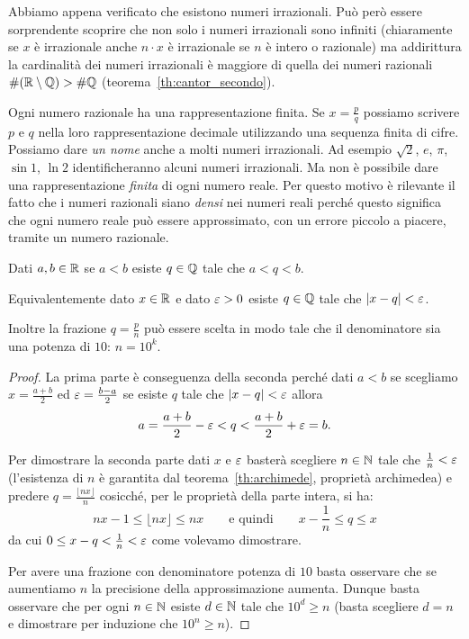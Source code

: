 Abbiamo appena verificato che esistono numeri irrazionali. 
Può però essere sorprendente scoprire che non solo i numeri irrazionali 
sono infiniti (chiaramente se $x$ è irrazionale anche $n\cdot x$ è irrazionale 
se $n$ è intero o razionale) ma addirittura la cardinalità 
dei numeri irrazionali è maggiore di quella dei numeri razionali 
$\# ({\mathbb R}\setminus {\mathbb Q}) > \# {\mathbb Q}$ (teorema~\ref{th:cantor_secondo}).

Ogni numero razionale ha una rappresentazione finita. 
Se $x=\frac p q$ possiamo scrivere $p$ e $q$ nella loro rappresentazione 
decimale utilizzando una sequenza finita di cifre.
Possiamo dare \emph{un nome} anche a molti
numeri irrazionali. 
Ad esempio $\sqrt 2$, $e$, $\pi$, $\sin 1$, $\ln 2$ identificheranno 
alcuni numeri irrazionali. 
Ma non è possibile dare una rappresentazione \emph{finita} di ogni numero reale.
Per questo motivo è rilevante il fatto che i numeri razionali siano \emph{densi}
nei numeri reali perché questo significa che ogni numero reale può essere 
approssimato, con un errore piccolo a piacere, tramite un numero razionale.

\begin{theorem}[densità di $\QQ$ in $\RR$]
\label{th:densita_frazioni}%
%
%
Dati $a,b\in {\mathbb R}$ se $a<b$ esiste $q\in {\mathbb Q}$ tale che $a< q < b$.

Equivalentemente dato $x\in {\mathbb R}$ e dato $\varepsilon>0$ esiste $q\in {\mathbb Q}$ 
tale che ${\left|x-q\right|} < \varepsilon$.

Inoltre la frazione $q= \frac{p}{n}$ può essere scelta 
in modo tale che il denominatore sia una potenza di $10$: $n=10^k$.
\end{theorem}
\begin{proof}
La prima parte è conseguenza della seconda perché 
dati $a<b$
se scegliamo 
$x= \frac{a+b}{2}$ ed $\varepsilon = \frac{b-a} 2$ se 
esiste $q$ tale che ${\left|x-q\right|}< \varepsilon$ 
allora 
\[
   a = \frac{a+b}{2} - \varepsilon < q < \frac{a+b}{2} + \varepsilon = b.
\]

Per dimostrare la seconda parte dati $x$ e $\varepsilon$ basterà scegliere 
$n\in {\mathbb N}$ tale che $\frac 1 n < \varepsilon$ (l'esistenza di $n$ è garantita 
dal teorema~\ref{th:archimede}, proprietà archimedea) e predere $q = \frac{\lfloor nx\rfloor}{n}$
cosicché, per le proprietà della parte intera, si ha:
\[
  nx-1\le \lfloor nx\rfloor \le nx 
  \qquad\text{e quindi}\qquad
  x - \frac 1 n \le q \le x
\]
da cui $0 \le x-q < \frac 1 n < \varepsilon$ come volevamo dimostrare.

Per avere una frazione con denominatore potenza di $10$ basta osservare 
che se aumentiamo $n$ la precisione della approssimazione aumenta. 
Dunque basta osservare che per ogni $n\in {\mathbb N}$ esiste $d\in {\mathbb N}$
tale che $10^d \ge n$ (basta scegliere $d=n$ e dimostrare per induzione 
che $10^n\ge n$).
\end{proof}

